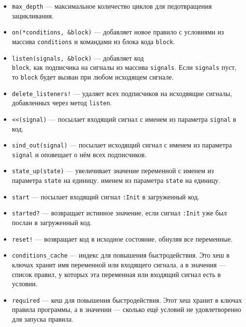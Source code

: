 \documentclass[utf8,a5paper,portrait,10pt,twoside]{eskdtext}
\begin{document}
\begin{itemize}
\begin{itemize}
          \item \texttt{max\_depth} — максимальное количество циклов для
                педотвращения зацикливания.
          \item \texttt{on(*conditions, \&block)} — добавляет новое правило
                с условиями из массива \texttt{conditions} и командами из блока
                кода \texttt{block}.
          \item \texttt{listen(signals, \&block)} — добавляет код\\
                \texttt{block}, как подписчика на сигналы из массива
                \texttt{signals}. Если \texttt{signals} пуст, то \texttt{block}
                будет вызван при любом исходящем сигнале.
          \item \texttt{delete\_listeners!} — удаляет всех подписчиков на
                исходяящие сигналы, добавленных через метод \texttt{listen}.
          \item \texttt{<<(signal)} — посылает входящий сигнал с именем
                из параметра \texttt{signal} в код.
          \item \texttt{sind\_out(signal)} — посылает исходящий сигнал с именем
                из параметра \texttt{signal} и оповещает о нём всех подписчиков.
          \item \texttt{state\_up(state)} — увеличивает значение переменной с
                именем из параметра \texttt{state} на единицу.
                именем из параметра \texttt{state} на единицу.
          \item \texttt{start} — посылает входящий сигнал \texttt{:Init} в
                загруженный код.
          \item \texttt{started?} — возвращает истинное значение, если сигнал
                \texttt{:Init} уже был послан в загруженный код.
          \item \texttt{reset!} — возвращает код в исходное состояние, обнуляя
                все переменные.
          \item \texttt{conditions\_cache} — индекс для повышения
                быстродействия. Это хеш в ключах хранит имя переменной или
                входящего сигнала, а в значения — список правил, у которых эта
                переменная или входящий сигнал есть в условии.
          \item \texttt{required} — кеш для повышения быстродействия. Этот хеш
                хранит в ключах правила программы, а в значении — сколько ещё
                условий не удовлетворенно для запуска правила.

\end{itemize}
\end{itemize}
\end{document}
